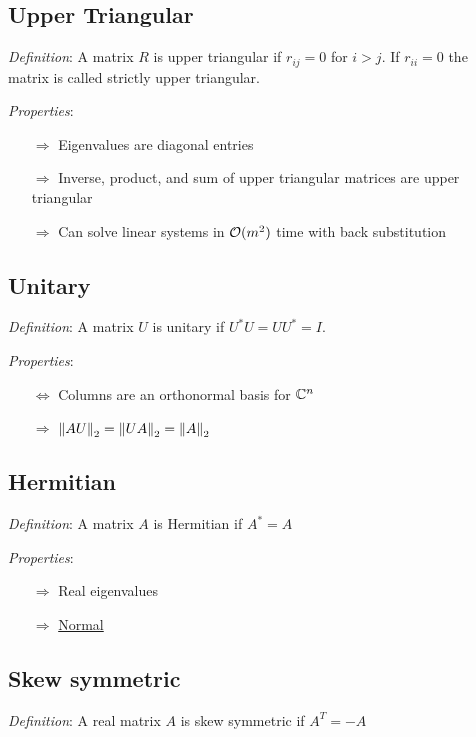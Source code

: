 \documentclass[12pt]{article}
\begin{document}
\subsection{Upper Triangular}
\textit{Definition}: A matrix \( R \) is upper triangular if \( r_{ij} = 0 \) for \( i>j \).
If \( r_{ii} = 0 \) the matrix is called strictly upper triangular. 

\textit{Properties}:
\begin{itemize}[nolistsep]
    \item[\(\Rightarrow\)] Eigenvalues are diagonal entries
    \item[\(\Rightarrow\)] Inverse, product, and sum of upper triangular matrices are upper triangular
    \item[\(\Rightarrow\)] Can solve linear systems in \( \mathcal{O}(m^2) \) time with back substitution
\end{itemize}


\subsection{Unitary}
\textit{Definition}: A matrix \( U \) is unitary if \( U^*U = UU^* = I  \).

\textit{Properties}:
\begin{itemize}[nolistsep]
    \item[\(\Leftrightarrow\)] Columns are an orthonormal basis for \( \mathbb{C}^n \)
    \item[\(\Rightarrow\)] \( \left\lVert AU\right\rVert_2 = \left\lVert UA\right\rVert_2 = \left\lVert A\right\rVert_2 \)
\end{itemize}


\subsection{Hermitian}
\label{sec:hermitian}
\textit{Definition}: A matrix \( A \) is Hermitian if \( A^* = A \)

\textit{Properties}:
\begin{itemize}[nolistsep]
    \item[\(\Rightarrow\)] Real eigenvalues
    \item[\(\Rightarrow\)] \hyperref[sec:normal]{Normal}
\end{itemize}


\subsection{Skew symmetric}
\textit{Definition}: A real matrix \( A \) is skew symmetric if \( A^T = -A \)
\end{document}
